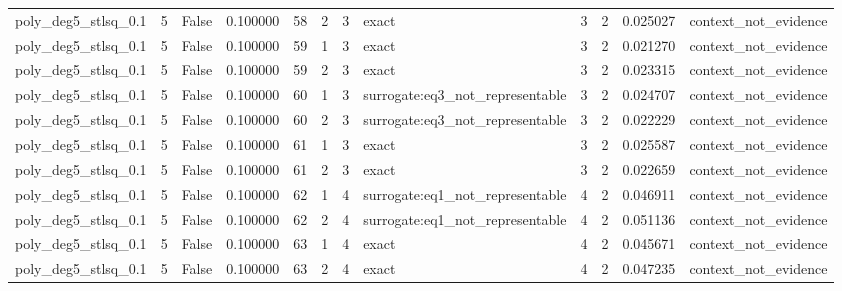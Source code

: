 \begin{tabular}{lrrrrrrlrrrl}
poly\_deg5\_stlsq\_0.1 & 5 & False & 0.100000 & 58 & 2 & 3 & exact & 3 & 2 & 0.025027 & context\_not\_evidence \\
poly\_deg5\_stlsq\_0.1 & 5 & False & 0.100000 & 59 & 1 & 3 & exact & 3 & 2 & 0.021270 & context\_not\_evidence \\
poly\_deg5\_stlsq\_0.1 & 5 & False & 0.100000 & 59 & 2 & 3 & exact & 3 & 2 & 0.023315 & context\_not\_evidence \\
poly\_deg5\_stlsq\_0.1 & 5 & False & 0.100000 & 60 & 1 & 3 & surrogate:eq3\_not\_representable & 3 & 2 & 0.024707 & context\_not\_evidence \\
poly\_deg5\_stlsq\_0.1 & 5 & False & 0.100000 & 60 & 2 & 3 & surrogate:eq3\_not\_representable & 3 & 2 & 0.022229 & context\_not\_evidence \\
poly\_deg5\_stlsq\_0.1 & 5 & False & 0.100000 & 61 & 1 & 3 & exact & 3 & 2 & 0.025587 & context\_not\_evidence \\
poly\_deg5\_stlsq\_0.1 & 5 & False & 0.100000 & 61 & 2 & 3 & exact & 3 & 2 & 0.022659 & context\_not\_evidence \\
poly\_deg5\_stlsq\_0.1 & 5 & False & 0.100000 & 62 & 1 & 4 & surrogate:eq1\_not\_representable & 4 & 2 & 0.046911 & context\_not\_evidence \\
poly\_deg5\_stlsq\_0.1 & 5 & False & 0.100000 & 62 & 2 & 4 & surrogate:eq1\_not\_representable & 4 & 2 & 0.051136 & context\_not\_evidence \\
poly\_deg5\_stlsq\_0.1 & 5 & False & 0.100000 & 63 & 1 & 4 & exact & 4 & 2 & 0.045671 & context\_not\_evidence \\
poly\_deg5\_stlsq\_0.1 & 5 & False & 0.100000 & 63 & 2 & 4 & exact & 4 & 2 & 0.047235 & context\_not\_evidence \\
\bottomrule
\end{tabular}
